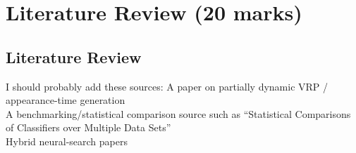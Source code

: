 \chapter{Literature Review (20 marks)}%
\label{chp:literature_review}




\section{Literature Review}
{\color{red}I should probably add these sources:
A paper on partially dynamic VRP / appearance-time generation \\
A benchmarking/statistical comparison source such as “Statistical Comparisons of Classifiers over Multiple Data Sets” \\
Hybrid neural-search papers}

